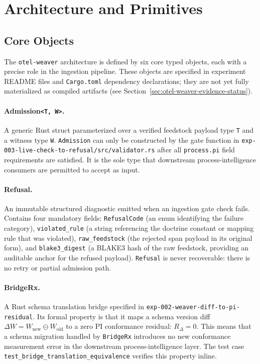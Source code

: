 
\section{Architecture and Primitives}
\label{sec:otel-weaver-arch}

\subsection{Core Objects}
\label{sec:otel-weaver-arch-objects}

The \texttt{otel-weaver} architecture is defined by six core typed objects, each with a precise
role in the ingestion pipeline. These objects are specified in experiment README files and
\texttt{Cargo.toml} dependency declarations; they are not yet fully materialized as compiled
artifacts (see Section~\ref{sec:otel-weaver-evidence-status}).

\paragraph{Admission\texttt{<T,\,W>}.}
A generic Rust struct parameterized over a verified feedstock payload type \texttt{T} and a
witness type \texttt{W}. \texttt{Admission} can only be constructed by the gate function in
\texttt{exp-003-live-check-to-refusal/src/validator.rs} after all \texttt{process.pi} field
requirements are satisfied. It is the sole type that downstream process-intelligence consumers
are permitted to accept as input.

\paragraph{Refusal.}
An immutable structured diagnostic emitted when an ingestion gate check fails. Contains four
mandatory fields: \texttt{RefusalCode} (an enum identifying the failure category),
\texttt{violated\_rule} (a string referencing the doctrine constant or mapping rule that was
violated), \texttt{raw\_feedstock} (the rejected span payload in its original form), and
\texttt{blake3\_digest} (a BLAKE3 hash of the raw feedstock, providing an auditable anchor
for the refused payload). \texttt{Refusal} is never recoverable: there is no retry or partial
admission path.

\paragraph{BridgeRx.}
A Rust schema translation bridge specified in \texttt{exp-002-weaver-diff-to-pi-residual}.
Its formal property is that it maps a schema version diff $\Delta W = W_{\text{new}} \ominus
W_{\text{old}}$ to a zero PI conformance residual: $R_\Delta = 0$. This means that a schema
migration handled by \texttt{BridgeRx} introduces no new conformance measurement error in the
downstream process-intelligence layer. The test case \texttt{test\_bridge\_translation\_equivalence}
verifies this property inline.

